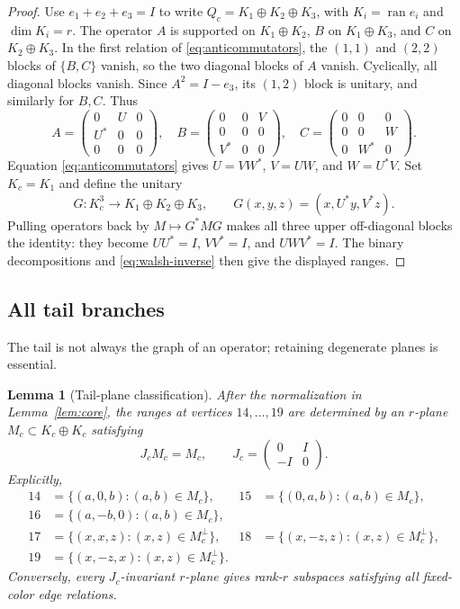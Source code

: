 \documentclass[11pt]{article}
\newtheorem{lemma}[theorem]{Lemma}
\newcommand{\ran}{\operatorname{ran}}
\begin{document}
\begin{proof}
Use $e_1+e_2+e_3=I$ to write $Q_c=K_1\oplus K_2\oplus K_3$, with
$K_i=\ran e_i$ and $\dim K_i=r$.  The operator $A$ is supported on
$K_1\oplus K_2$, $B$ on $K_1\oplus K_3$, and $C$ on
$K_2\oplus K_3$.  In the first relation of \eqref{eq:anticommutators}, the
$(1,1)$ and $(2,2)$ blocks of $\{B,C\}$ vanish, so the two diagonal blocks of
$A$ vanish.  Cyclically, all diagonal blocks vanish.  Since
$A^2=I-e_3$, its $(1,2)$ block is unitary, and similarly for $B,C$.  Thus
\[
A=\begin{pmatrix}0&U&0\\U^*&0&0\\0&0&0\end{pmatrix},\quad
B=\begin{pmatrix}0&0&V\\0&0&0\\V^*&0&0\end{pmatrix},\quad
C=\begin{pmatrix}0&0&0\\0&0&W\\0&W^*&0\end{pmatrix}.
\]
Equation \eqref{eq:anticommutators} gives
$U=VW^*$, $V=UW$, and $W=U^*V$.  Set $K_c=K_1$ and define the unitary
\[
 G:K_c^3\longrightarrow K_1\oplus K_2\oplus K_3,
 \qquad G(x,y,z)=(x,U^*y,V^*z).
\]
Pulling operators back by $M\mapsto G^*MG$ makes all three upper
off-diagonal blocks the identity: they become $UU^*=I$, $VV^*=I$, and
$UWV^*=I$.  The binary decompositions and \eqref{eq:walsh-inverse} then give
the displayed ranges.
\end{proof}

\subsection{All tail branches}

The tail is not always the graph of an operator; retaining degenerate planes
is essential.

\begin{lemma}[Tail-plane classification]\label{lem:tail}
After the normalization in Lemma~\ref{lem:core}, the ranges at vertices
$14,\ldots,19$ are determined by an $r$-plane
$M_c\subset K_c\oplus K_c$ satisfying
\begin{equation}\label{eq:J-invariance}
       J_cM_c=M_c,\qquad
       J_c=\begin{pmatrix}0&I\\-I&0\end{pmatrix}.
\end{equation}
Explicitly,
\begin{align}
14&=\{(a,0,b):(a,b)\in M_c\},&
15&=\{(0,a,b):(a,b)\in M_c\},\nonumber\\
16&=\{(a,-b,0):(a,b)\in M_c\},\label{eq:tail-form}\\
17&=\{(x,x,z):(x,z)\in M_c^\perp\},&
18&=\{(x,-z,z):(x,z)\in M_c^\perp\},\nonumber\\
19&=\{(x,-z,x):(x,z)\in M_c^\perp\}.\nonumber
\end{align}
Conversely, every $J_c$-invariant $r$-plane gives rank-$r$ subspaces
satisfying all fixed-color edge relations.
\end{lemma}
\end{document}
